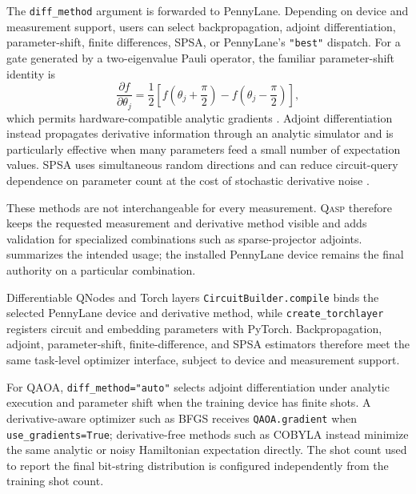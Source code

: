 \documentclass[10pt]{article}
\newcommand{\qasp}{\textsc{Qasp}}
\newcommand{\code}[1]{\texttt{#1}}
\begin{document}
The \code{diff\_method} argument is forwarded to PennyLane.  Depending on device and measurement support, users can select backpropagation, adjoint differentiation, parameter-shift, finite differences, SPSA, or PennyLane's \code{"best"} dispatch.  For a gate generated by a two-eigenvalue Pauli operator, the familiar parameter-shift identity is
\begin{equation}
  \frac{\partial f}{\partial\theta_j}
  = \frac{1}{2}\left[f\!\left(\theta_j+\frac{\pi}{2}\right)
  -f\!\left(\theta_j-\frac{\pi}{2}\right)\right],
  \label{eq:paramshift}
\end{equation}
which permits hardware-compatible analytic gradients \cite{schuld2019gradients}.  Adjoint differentiation instead propagates derivative information through an analytic simulator and is particularly effective when many parameters feed a small number of expectation values.  SPSA uses simultaneous random directions and can reduce circuit-query dependence on parameter count at the cost of stochastic derivative noise \cite{spall1992spsa}.

These methods are not interchangeable for every measurement.  \qasp{} therefore keeps the requested measurement and derivative method visible and adds validation for specialized combinations such as sparse-projector adjoints.   summarizes the intended usage; the installed PennyLane device remains the final authority on a particular combination.

\begin{qaspfeature}{Differentiable QNodes and Torch layers}
\code{CircuitBuilder.compile} binds the selected PennyLane device and
derivative method, while \code{create\_torchlayer} registers circuit and
embedding parameters with PyTorch.  Backpropagation, adjoint,
parameter-shift, finite-difference, and SPSA estimators therefore meet the same
task-level optimizer interface, subject to device and measurement support.
\end{qaspfeature}

For QAOA, \code{diff\_method="auto"} selects adjoint differentiation under
analytic execution and parameter shift when the training device has finite
shots.  A derivative-aware optimizer such as BFGS receives
\code{QAOA.gradient} when \code{use\_gradients=True}; derivative-free methods
such as COBYLA instead minimize the same analytic or noisy Hamiltonian
expectation directly.  The shot count used to report the final bit-string
distribution is configured independently from the training shot count.
\end{document}
